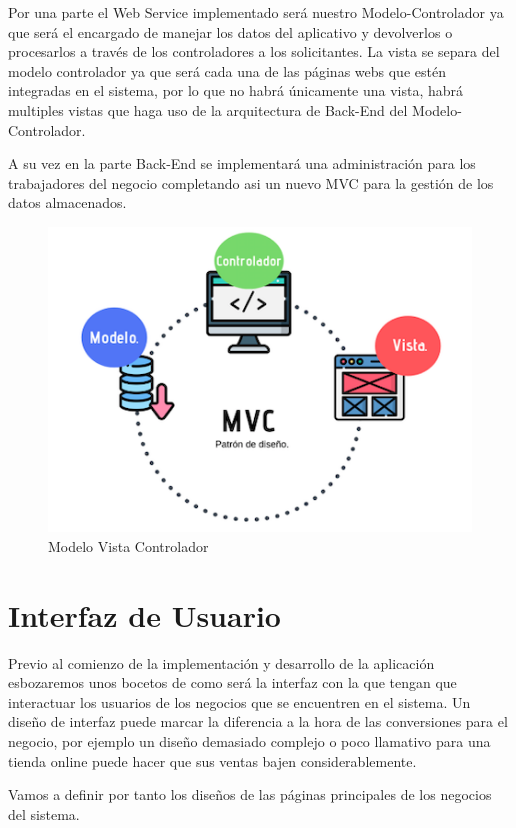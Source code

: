 Por una parte el Web Service implementado será nuestro Modelo-Controlador ya que será el encargado de manejar los datos del aplicativo y devolverlos o procesarlos a través de los controladores a los solicitantes. La vista se separa del modelo controlador ya que será cada una de las páginas webs que estén integradas en el sistema, por lo que no habrá únicamente una vista, habrá multiples vistas que haga uso de la arquitectura de Back-End del Modelo-Controlador.

A su vez en la parte Back-End se implementará una administración para los trabajadores del negocio completando asi un nuevo MVC para la gestión de los datos almacenados.

\begin{figure}[H]
  \centering
  \includegraphics[scale=0.6]{images/Modelo_Vista_Controlador.png}
  \caption{Modelo Vista Controlador}
  \label{}
\end{figure}

\section{Interfaz de Usuario}

Previo al comienzo de la implementación y desarrollo de la aplicación esbozaremos unos bocetos de como será la interfaz con la que tengan que interactuar los usuarios de los negocios que se encuentren en el sistema. Un diseño de interfaz puede marcar la diferencia a la hora de las conversiones para el negocio, por ejemplo un diseño demasiado complejo o poco llamativo para una tienda online puede hacer que sus ventas bajen considerablemente.

Vamos a definir por tanto los diseños de las páginas principales de los negocios del sistema.

